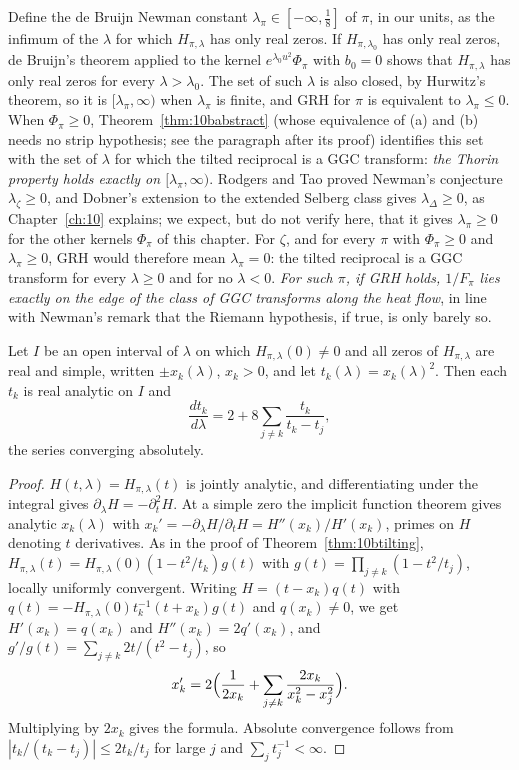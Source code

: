 Define the de Bruijn Newman constant $\lambda_\pi\in[-\infty,\frac18]$ of $\pi$, in our units, as the infimum of the $\lambda$ for which $H_{\pi,\lambda}$ has only real zeros. If $H_{\pi,\lambda_0}$ has only real zeros, de Bruijn's theorem applied to the kernel $e^{\lambda_0u^2}\Phi_\pi$ with $b_0=0$ shows that $H_{\pi,\lambda}$ has only real zeros for every $\lambda>\lambda_0$. The set of such $\lambda$ is also closed, by Hurwitz's theorem, so it is $[\lambda_\pi,\infty)$ when $\lambda_\pi$ is finite, and GRH for $\pi$ is equivalent to $\lambda_\pi\le0$. When $\Phi_\pi\ge0$, Theorem~\ref{thm:10babstract} (whose equivalence of (a) and (b) needs no strip hypothesis; see the paragraph after its proof) identifies this set with the set of $\lambda$ for which the tilted reciprocal is a GGC transform: \emph{the Thorin property holds exactly on $[\lambda_\pi,\infty)$}. Rodgers and Tao \cite{rodgerstao2020} proved Newman's conjecture $\lambda_\zeta\ge0$, and Dobner's extension \cite{dobner2021} to the extended Selberg class gives $\lambda_\Delta\ge0$, as Chapter~\ref{ch:10} explains; we expect, but do not verify here, that it gives $\lambda_\pi\ge0$ for the other kernels $\Phi_\pi$ of this chapter. For $\zeta$, and for every $\pi$ with $\Phi_\pi\ge0$ and $\lambda_\pi\ge0$, GRH would therefore mean $\lambda_\pi=0$: the tilted reciprocal is a GGC transform for every $\lambda\ge0$ and for no $\lambda<0$. \emph{For such $\pi$, if GRH holds, $1/F_\pi$ lies exactly on the edge of the class of GGC transforms along the heat flow}, in line with Newman's remark that the Riemann hypothesis, if true, is only barely so.

\begin{proposition}\label{prop:10bflow}
Let $I$ be an open interval of $\lambda$ on which $H_{\pi,\lambda}(0)\ne0$ and all zeros of $H_{\pi,\lambda}$ are real and simple, written $\pm x_k(\lambda)$, $x_k>0$, and let $t_k(\lambda) = x_k(\lambda)^2$. Then each $t_k$ is real analytic on $I$ and
\[
\frac{dt_k}{d\lambda} = 2+8\sum_{j\ne k}\frac{t_k}{t_k-t_j},
\]
the series converging absolutely.
\end{proposition}

\begin{proof}
$H(t,\lambda) = H_{\pi,\lambda}(t)$ is jointly analytic, and differentiating under the integral gives $\partial_\lambda H = -\partial_t^2H$. At a simple zero the implicit function theorem gives analytic $x_k(\lambda)$ with $x_k' = -\partial_\lambda H/\partial_tH = H''(x_k)/H'(x_k)$, primes on $H$ denoting $t$ derivatives. As in the proof of Theorem~\ref{thm:10btilting}, $H_{\pi,\lambda}(t) = H_{\pi,\lambda}(0)(1-t^2/t_k)g(t)$ with $g(t) = \prod_{j\ne k}(1-t^2/t_j)$, locally uniformly convergent. Writing $H = (t-x_k)q(t)$ with $q(t) = -H_{\pi,\lambda}(0)t_k^{-1}(t+x_k)g(t)$ and $q(x_k)\ne0$, we get $H'(x_k) = q(x_k)$ and $H''(x_k) = 2q'(x_k)$, and $g'/g(t) = \sum_{j\ne k}2t/(t^2-t_j)$, so
\[
x_k' = 2\Bigl(\frac1{2x_k}+\sum_{j\ne k}\frac{2x_k}{x_k^2-x_j^2}\Bigr).
\]
Multiplying by $2x_k$ gives the formula. Absolute convergence follows from $|t_k/(t_k-t_j)|\le2t_k/t_j$ for large $j$ and $\sum_jt_j^{-1}<\infty$.
\end{proof}

